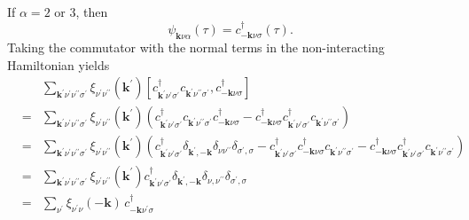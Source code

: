 If $\alpha = 2$ or 3, then
\begin{equation}
\psi_{\mathbf{k}\nu\alpha}(\tau) = c^{\dagger}_{-\mathbf{k}\nu\sigma}(\tau).
\end{equation}
Taking the commutator with the normal terms in the
non-interacting Hamiltonian yields
\begin{eqnarray}
& & \sum_{\mathbf{k}^{\prime}\nu^{\prime}\nu^{\prime\prime}\sigma^{\prime}}
\xi_{\nu^{\prime}\nu^{\prime\prime}}(\mathbf{k}^{\prime})
\left[ c^{\dagger}_{\mathbf{k}^{\prime}\nu^{\prime}\sigma^{\prime}}
c_{\mathbf{k}^{\prime}\nu^{\prime\prime}\sigma^{\prime}},
c^{\dagger}_{-\mathbf{k}\nu\sigma}
\right] \\
& = & 
\sum_{\mathbf{k}^{\prime}\nu^{\prime}\nu^{\prime\prime}\sigma^{\prime}}
\xi_{\nu^{\prime}\nu^{\prime\prime}}(\mathbf{k}^{\prime})
\left(c^{\dagger}_{\mathbf{k}^{\prime}\nu^{\prime}\sigma^{\prime}}
c_{\mathbf{k}^{\prime}\nu^{\prime\prime}\sigma^{\prime}}
c^{\dagger}_{-\mathbf{k}\nu\sigma} -
c^{\dagger}_{-\mathbf{k}\nu\sigma}
c^{\dagger}_{\mathbf{k}^{\prime}\nu^{\prime}\sigma^{\prime}}
c_{\mathbf{k}^{\prime}\nu^{\prime\prime}\sigma^{\prime}}
\right) \\
& = &
\sum_{\mathbf{k}^{\prime}\nu^{\prime}\nu^{\prime\prime}\sigma^{\prime}}
\xi_{\nu^{\prime}\nu^{\prime\prime}}(\mathbf{k}^{\prime})
\left(c^{\dagger}_{\mathbf{k}^{\prime}\nu^{\prime}\sigma^{\prime}}
\delta_{\mathbf{k}^{\prime},-\mathbf{k}}\delta_{\nu\nu^{\prime\prime}}
\delta_{\sigma^{\prime},\sigma} -
c^{\dagger}_{\mathbf{k}^{\prime}\nu^{\prime}\sigma^{\prime}}
c^{\dagger}_{-\mathbf{k}\nu\sigma}
c_{\mathbf{k}^{\prime}\nu^{\prime\prime}\sigma^{\prime}} -
c^{\dagger}_{-\mathbf{k}\nu\sigma}
c^{\dagger}_{\mathbf{k}^{\prime}\nu^{\prime}\sigma^{\prime}}
c_{\mathbf{k}^{\prime}\nu^{\prime\prime}\sigma^{\prime}} \right)
\\
& = &
\sum_{\mathbf{k}^{\prime}\nu^{\prime}\nu^{\prime\prime}\sigma^{\prime}}
\xi_{\nu^{\prime}\nu^{\prime\prime}}(\mathbf{k}^{\prime})
c^{\dagger}_{\mathbf{k}^{\prime}\nu^{\prime}\sigma^{\prime}}
\delta_{\mathbf{k}^{\prime},-\mathbf{k}}\delta_{\nu,\nu^{\prime\prime}}
\delta_{\sigma^{\prime},\sigma} \\
& = & \sum_{\nu^{\prime}}
\xi_{\nu^{\prime}\nu}(-\mathbf{k})\,c^{\dagger}_{-\mathbf{k}\nu^{\prime}\sigma}
\end{eqnarray}

